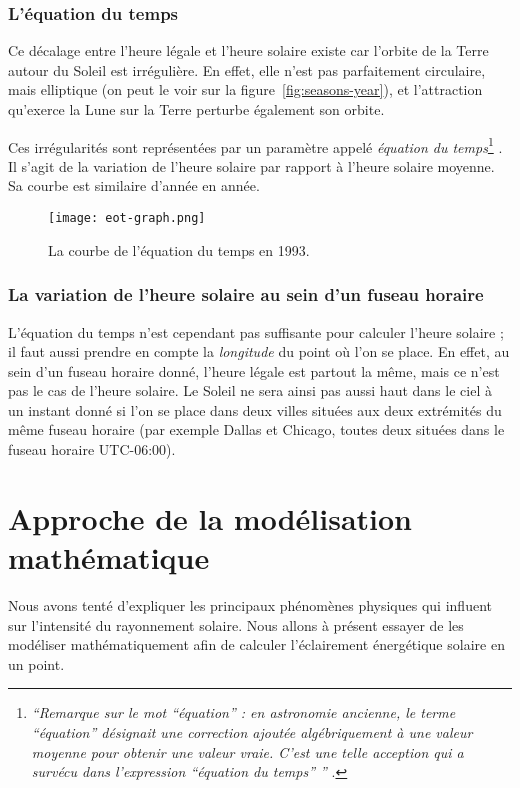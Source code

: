 \documentclass[12pt]{article}
\begin{document}
\clearpage
\subsubsection{L'équation du temps}
Ce décalage entre l'heure légale et l'heure solaire existe car l'orbite de la Terre autour du Soleil est irrégulière.
En effet, elle n'est pas parfaitement circulaire, mais elliptique (on peut le voir sur la figure~\ref{fig:seasons-year}), et l'attraction qu'exerce la Lune sur la Terre perturbe également son orbite.

Ces irrégularités sont représentées par un paramètre appelé \emph{équation du temps}\footnote{\textit{``Remarque sur le mot ``équation'' : en astronomie ancienne, le terme ``équation'' désignait une correction ajoutée algébriquement à une valeur moyenne pour obtenir une valeur vraie.
C'est une telle acception qui a survécu dans l'expression ``équation du temps'' ''} \cite{equation_temps_wiki}.} \cite{equation_temps_wiki}.
Il s'agit de la variation de l'heure solaire par rapport à l'heure solaire moyenne.
Sa courbe est similaire d'année en année.

 \begin{figure}[H]
	\centerline{\texttt{[image: eot-graph.png]}}
	\caption{
		La courbe de l'équation du temps en 1993.
	}
	\label{fig:eot-graph}
\end{figure}

\subsubsection{La variation de l'heure solaire au sein d'un fuseau horaire}
L'équation du temps n'est cependant pas suffisante pour calculer l'heure solaire ; il faut aussi prendre en compte la \emph{longitude} du point où l'on se place.
En effet, au sein d'un fuseau horaire donné, l'heure légale est partout la même, mais ce n'est pas le cas de l'heure solaire.
Le Soleil ne sera ainsi pas aussi haut dans le ciel à un instant donné si l'on se place dans deux villes situées aux deux extrémités du même fuseau horaire (par exemple Dallas et Chicago, toutes deux situées dans le fuseau horaire UTC-06:00).


\section{Approche de la modélisation mathématique}


Nous avons tenté d'expliquer les principaux phénomènes physiques qui influent sur l'intensité du rayonnement solaire.
Nous allons à présent essayer de les modéliser mathématiquement afin de calculer l'éclairement énergétique solaire en un point.
\end{document}
